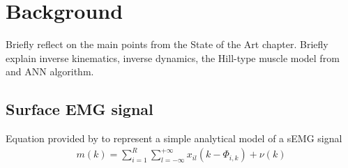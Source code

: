 \documentclass[../main.tex]{subfiles}
\begin{document}
\chapter{Background}
Briefly reflect on the main points from the State of the Art chapter.
Briefly explain inverse kinematics, inverse dynamics, the Hill-type muscle model from \cite{Pizzolato2015} and ANN algorithm.

\section{Surface EMG signal}
Equation provided by \parencite[97]{Farina2016a} to represent a simple analytical model of a \ac{sEMG} signal
\begin{align}
    m(k) = \sum_{i=1}^R \sum_{l=-\infty}^{+\infty}x_{il}\left(k-\Phi_{i,k}\right) + \nu (k)
\end{align}
\end{document}
